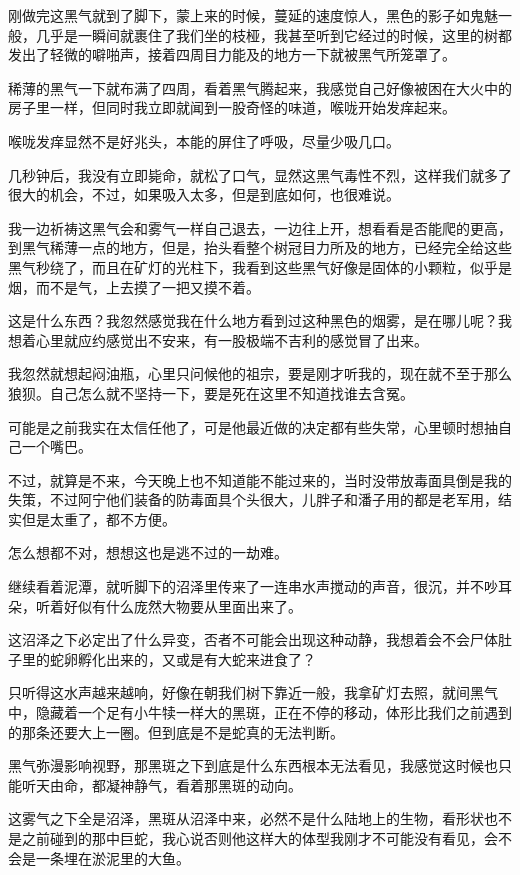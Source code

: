 刚做完这黑气就到了脚下，蒙上来的时候，蔓延的速度惊人，黑色的影子如鬼魅一般，几乎是一瞬间就裹住了我们坐的枝桠，我甚至听到它经过的时候，这里的树都发出了轻微的噼啪声，接着四周目力能及的地方一下就被黑气所笼罩了。

稀薄的黑气一下就布满了四周，看着黑气腾起来，我感觉自己好像被困在大火中的房子里一样，但同时我立即就闻到一股奇怪的味道，喉咙开始发痒起来。

喉咙发痒显然不是好兆头，本能的屏住了呼吸，尽量少吸几口。

几秒钟后，我没有立即毙命，就松了口气，显然这黑气毒性不烈，这样我们就多了很大的机会，不过，如果吸入太多，但是到底如何，也很难说。

我一边祈祷这黑气会和雾气一样自己退去，一边往上开，想看看是否能爬的更高，到黑气稀薄一点的地方，但是，抬头看整个树冠目力所及的地方，已经完全给这些黑气秒绕了，而且在矿灯的光柱下，我看到这些黑气好像是固体的小颗粒，似乎是烟，而不是气，上去摸了一把又摸不着。

这是什么东西？我忽然感觉我在什么地方看到过这种黑色的烟雾，是在哪儿呢？我想着心里就应约感觉出不安来，有一股极端不吉利的感觉冒了出来。

我忽然就想起闷油瓶，心里只问候他的祖宗，要是刚才听我的，现在就不至于那么狼狈。自己怎么就不坚持一下，要是死在这里不知道找谁去含冤。

可能是之前我实在太信任他了，可是他最近做的决定都有些失常，心里顿时想抽自己一个嘴巴。

不过，就算是不来，今天晚上也不知道能不能过来的，当时没带放毒面具倒是我的失策，不过阿宁他们装备的防毒面具个头很大，儿胖子和潘子用的都是老军用，结实但是太重了，都不方便。

怎么想都不对，想想这也是逃不过的一劫难。

继续看着泥潭，就听脚下的沼泽里传来了一连串水声搅动的声音，很沉，并不吵耳朵，听着好似有什么庞然大物要从里面出来了。

这沼泽之下必定出了什么异变，否者不可能会出现这种动静，我想着会不会尸体肚子里的蛇卵孵化出来的，又或是有大蛇来进食了？

只听得这水声越来越响，好像在朝我们树下靠近一般，我拿矿灯去照，就间黑气中，隐藏着一个足有小牛犊一样大的黑斑，正在不停的移动，体形比我们之前遇到的那条还要大上一圈。但到底是不是蛇真的无法判断。

黑气弥漫影响视野，那黑斑之下到底是什么东西根本无法看见，我感觉这时候也只能听天由命，都凝神静气，看着那黑斑的动向。

这雾气之下全是沼泽，黑斑从沼泽中来，必然不是什么陆地上的生物，看形状也不是之前碰到的那中巨蛇，我心说否则他这样大的体型我刚才不可能没有看见，会不会是一条埋在淤泥里的大鱼。

